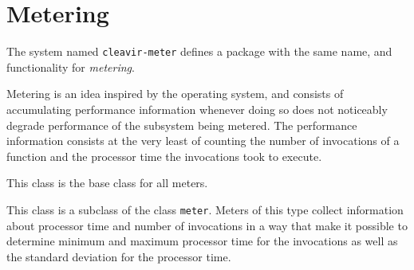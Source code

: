 \chapter{Metering}

The system named \texttt{cleavir-meter} defines a package with the
same name, and functionality for \emph{metering}. 

Metering is an idea inspired by the \multics{} operating system, and
consists of accumulating performance information whenever doing so
does not noticeably degrade performance of the subsystem being
metered.  The performance information consists at the very least of
counting the number of invocations of a function and the processor
time the invocations took to execute.


This class is the base class for all meters.


This class is a subclass of the class \texttt{meter}.  Meters of this
type collect information about processor time and number of
invocations in a way that make it possible to determine minimum and
maximum processor time for the invocations as well as the standard
deviation for the processor time.
